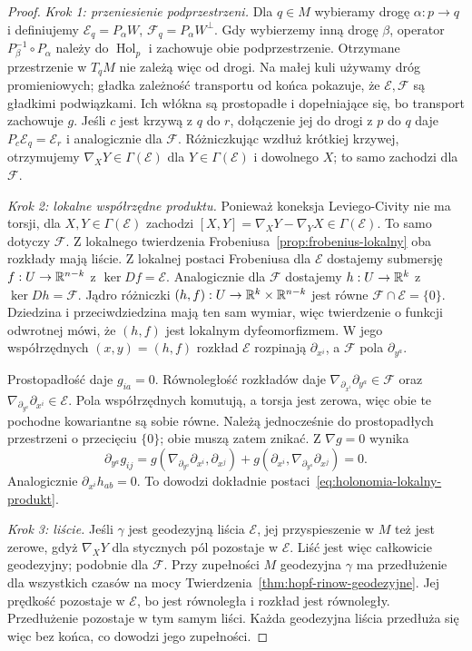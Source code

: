 \begin{proof}
\emph{Krok 1: przeniesienie podprzestrzeni.}
Dla $q\in M$ wybieramy drogę $\alpha:p\to q$ i
definiujemy $\mathcal E_q=P_\alpha W$,
$\mathcal F_q=P_\alpha W^\perp$. Gdy wybierzemy inną
drogę $\beta$, operator $P_\beta^{-1}\circ P_\alpha$
należy do $\operatorname{Hol}_p$ i zachowuje obie
podprzestrzenie. Otrzymane przestrzenie w $T_qM$
nie zależą więc od drogi. Na małej kuli używamy dróg
promieniowych; gładka zależność transportu od końca
pokazuje, że $\mathcal E,\mathcal F$ są gładkimi
podwiązkami. Ich włókna są prostopadłe i dopełniające się,
bo transport zachowuje $g$. Jeśli $c$ jest krzywą
z $q$ do $r$, dołączenie jej do drogi z $p$ do $q$
daje $P_c\mathcal E_q=\mathcal E_r$ i analogicznie
dla $\mathcal F$. Różniczkując wzdłuż krótkiej krzywej,
otrzymujemy $\nabla_XY\in\Gamma(\mathcal E)$ dla
$Y\in\Gamma(\mathcal E)$ i dowolnego $X$; to samo
zachodzi dla $\mathcal F$.

\emph{Krok 2: lokalne współrzędne produktu.}
Ponieważ koneksja Leviego-Civity nie ma torsji,
dla $X,Y\in\Gamma(\mathcal E)$ zachodzi
$[X,Y]=\nabla_XY-\nabla_YX\in\Gamma(\mathcal E)$.
To samo dotyczy $\mathcal F$. Z lokalnego twierdzenia
Frobeniusa~\ref{prop:frobenius-lokalny} oba rozkłady
mają liście. Z lokalnej postaci Frobeniusa dla
$\mathcal E$ dostajemy submersję
$f:U\to\mathbb{R}^{n-k}$ z $\ker Df=\mathcal E$.
Analogicznie dla $\mathcal F$ dostajemy
$h:U\to\mathbb{R}^k$ z $\ker Dh=\mathcal F$.
Jądro różniczki $(h,f):U\to\mathbb{R}^k\times\mathbb{R}^{n-k}$
jest równe $\mathcal F\cap\mathcal E=\{0\}$.
Dziedzina i przeciwdziedzina mają ten sam wymiar,
więc twierdzenie o funkcji odwrotnej mówi, że $(h,f)$
jest lokalnym dyfeomorfizmem. W jego współrzędnych
$(x,y)=(h,f)$ rozkład $\mathcal E$ rozpinają
$\partial_{x^i}$, a $\mathcal F$ pola $\partial_{y^a}$.

Prostopadłość daje $g_{ia}=0$. Równoległość rozkładów
daje $\nabla_{\partial_{x^i}}\partial_{y^a}\in\mathcal F$
oraz $\nabla_{\partial_{y^a}}\partial_{x^i}\in\mathcal E$.
Pola współrzędnych komutują, a torsja jest zerowa, więc
obie te pochodne kowariantne są sobie równe. Należą
jednocześnie do prostopadłych przestrzeni o przecięciu
$\{0\}$; obie muszą zatem znikać. Z $\nabla g=0$ wynika
\[
 \partial_{y^a}g_{ij}
 =g(\nabla_{\partial_{y^a}}\partial_{x^i},
                         \partial_{x^j})
  +g(\partial_{x^i},
     \nabla_{\partial_{y^a}}\partial_{x^j})=0.
\]
Analogicznie $\partial_{x^i}h_{ab}=0$.
To dowodzi dokładnie postaci~\eqref{eq:holonomia-lokalny-produkt}.

\emph{Krok 3: liście.} Jeśli $\gamma$ jest geodezyjną
liścia $\mathcal E$, jej przyspieszenie w $M$ też jest
zerowe, gdyż $\nabla_XY$ dla stycznych pól pozostaje
w $\mathcal E$. Liść jest więc całkowicie geodezyjny;
podobnie dla $\mathcal F$. Przy zupełności $M$
geodezyjna $\gamma$ ma przedłużenie dla wszystkich
czasów na mocy Twierdzenia~\ref{thm:hopf-rinow-geodezyjne}.
Jej prędkość pozostaje w $\mathcal E$, bo jest
równoległa i rozkład jest równoległy. Przedłużenie
pozostaje w tym samym liści. Każda geodezyjna liścia
przedłuża się więc bez końca, co dowodzi jego zupełności.
\end{proof}

